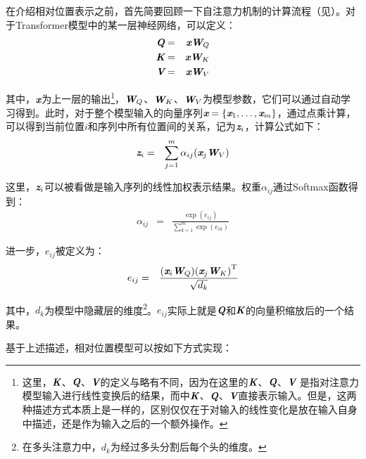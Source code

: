 \parinterval 在介绍相对位置表示之前，首先简要回顾一下自注意力机制的计算流程（见{\chaptertwelve}）。对于Transformer模型中的某一层神经网络，可以定义：
\begin{eqnarray}
\textbf{\em Q} & = & \textbf{\em x} \textbf{\em W}_Q \\
\textbf{\em K} & = & \textbf{\em x} \textbf{\em W}_K \\
\textbf{\em V} & = & \textbf{\em x} \textbf{\em W}_V
\label{eq:15-3}
\end{eqnarray}

\noindent 其中，$\textbf{\em x}$为上一层的输出\footnote[2]{这里，$\textbf{\em K}$、$\textbf{\em Q}$、$\textbf{\em V}$的定义与{\chaptertwelve}略有不同，因为在这里的$\textbf{\em K}$、$\textbf{\em Q}$、$\textbf{\em V}$ 是指对注意力模型输入进行线性变换后的结果，而{\chaptertwelve}中$\textbf{\em K}$、$\textbf{\em Q}$、$\textbf{\em V}$直接表示输入。但是，这两种描述方式本质上是一样的，区别仅仅在于对输入的线性变化是放在输入自身中描述，还是作为输入之后的一个额外操作。}，$\textbf{\em W}_Q$、$\textbf{\em W}_K$、$\textbf{\em W}_V$为模型参数，它们可以通过自动学习得到。此时，对于整个模型输入的向量序列$\textbf{\em x}=\{\textbf{\em x}_1,\ldots,\textbf{\em x}_m\}$，通过点乘计算，可以得到当前位置$i$和序列中所有位置间的关系，记为$\textbf{\em z}_{i} $，计算公式如下：
\begin{eqnarray}
\textbf{\em z}_{i} &=& \sum_{j=1}^m \alpha_{ij}(\textbf{\em x}_j \textbf{\em W}_V)
\label{eq:15-4}
\end{eqnarray}

\noindent 这里，$\textbf{\em z}_{i}$可以被看做是输入序列的线性加权表示结果。权重$\alpha_{ij}$通过Softmax函数得到：
\begin{eqnarray}
\alpha_{ij} &=& \frac{\exp ({e}_{ij})}{\sum_{k=1}^{m}\exp ({e}_{ik})}
\label{eq:15-5}
\end{eqnarray}

\noindent 进一步，${e}_{ij}$被定义为：
\begin{eqnarray}
{e}_{ij} &=& \frac{(\textbf{\em x}_i \textbf{\em W}_Q){(\textbf{\em x}_j \textbf{\em W}_K)}^{\textrm{T}}}{\sqrt{d_k}}
\label{eq:15-6}
\end{eqnarray}

\noindent 其中，$d_k$为模型中隐藏层的维度\footnote[3]{在多头注意力中，$d_k$为经过多头分割后每个头的维度。}。${e}_{ij}$实际上就是$\textbf{\em Q}$和$\textbf{\em K}$的向量积缩放后的一个结果。

\parinterval 基于上述描述，相对位置模型可以按如下方式实现：

